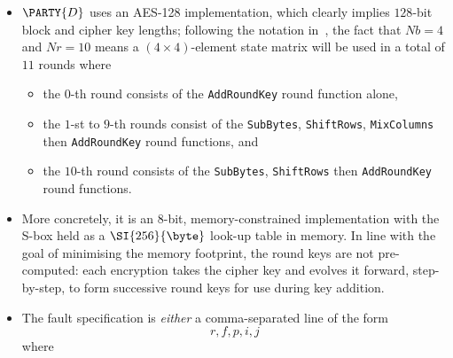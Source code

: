 \documentclass[crop={false},multi={true},tikz={true}]{standalone}
\begin{document}
\begin{itemize}
\item $\PARTY{D}$ uses an AES-128 implementation,
      which clearly implies $128$-bit block and cipher key lengths;
      following the notation in~\cite[Figure 5]{SCALE:FIPS:197:01}, the 
      fact that $Nb=4$ and $Nr=10$ means a $(4 \times 4)$-element state 
      matrix will be used in a total of $11$ rounds
      where

      \begin{itemize}
      \item the  $0$-th           round  consists of the
            \lstinline{AddRoundKey}
            round function  alone,
      \item the  $1$-st to $9$-th rounds consist  of the
            \lstinline{SubBytes}, \lstinline{ShiftRows},  \lstinline{MixColumns} then  \lstinline{AddRoundKey}
            round functions,
            and
      \item the $10$-th           round  consists of the
            \lstinline{SubBytes}, \lstinline{ShiftRows}                          then  \lstinline{AddRoundKey}
            round functions.
      \end{itemize}

\item More concretely, it is an $8$-bit, memory-constrained implementation
      with the S-box held as a $\SI{256}{\byte}$ look-up table in memory. 
      In line with the goal of minimising the memory footprint, the round
      keys are not pre-computed: each encryption takes the cipher key and
      evolves it forward, step-by-step, to form successive round keys for
      use during key addition.  
\item The fault specification is {\em either} a comma-separated line of the
      form
      \[
      r, f, p, i, j
      \]
      where


\end{itemize}
\end{document}

